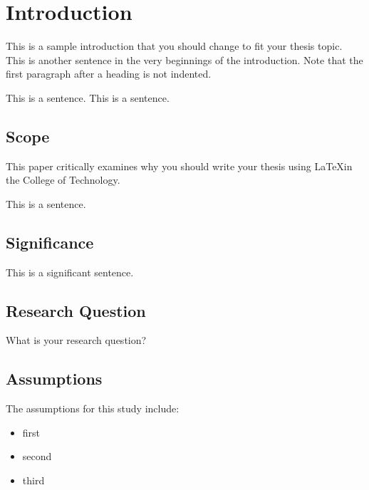 %
%
%


\chapter{Introduction}

This is a sample introduction that you should change to fit your thesis topic.
This is another sentence in the very beginnings of the introduction.
Note that the first paragraph after a heading is not indented.

This is a sentence.
This is a sentence.

\section{Scope}

This paper critically examines why you should write your thesis using \LaTeX in the College of Technology.

This is a sentence.


\section{Significance}

This is a significant sentence.


\section{Research Question}

What is your research question?


\section{Assumptions}

The assumptions for this study include:
\begin{itemize}
\item first
\item second
\item third
\end{itemize}



